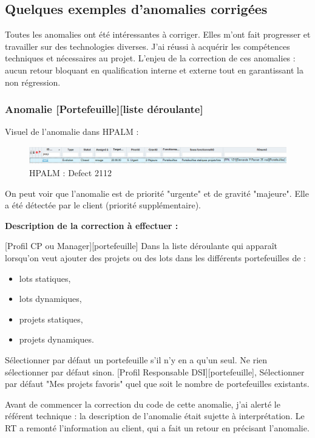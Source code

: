 \subsection{Quelques exemples d'anomalies corrigées}

Toutes les anomalies ont été intéressantes à corriger. Elles m'ont fait progresser et travailler sur des technologies diverses. J'ai réussi à acquérir les compétences techniques et nécessaires au projet. L'enjeu de la correction de ces anomalies : aucun retour bloquant en qualification interne et externe tout en garantissant la non régression.

\subsubsection{Anomalie [Portefeuille][liste déroulante]}

Visuel de l'anomalie dans HPALM :
\begin{figure}[!h]
\centering
\includegraphics[width=1\textwidth]{images/QC2120.PNG}
\caption{HPALM : Defect 2112}
\end{figure}

On peut voir que l'anomalie est de priorité "urgente" et de gravité "majeure". Elle a été détectée par le client (priorité supplémentaire).

\textbf{Description de la correction à effectuer :} 

[Profil CP ou Manager][portefeuille]
Dans la liste déroulante qui apparaît lorsqu'on veut ajouter des projets ou des lots dans les différents portefeuilles de : 
\begin{itemize}
    \item lots statiques,
    \item lots dynamiques,
    \item projets statiques,
    \item projets dynamiques.
\end{itemize}

Sélectionner par défaut un portefeuille s'il n'y en a qu'un seul. Ne rien sélectionner par défaut sinon. 
[Profil Responsable DSI][portefeuille], Sélectionner par défaut "Mes projets favoris" quel que soit le nombre de portefeuilles existants.

Avant de commencer la correction du code de cette anomalie, j'ai alerté le référent technique : la description de l'anomalie était sujette à interprétation. Le RT a remonté l'information au client, qui a fait un retour en précisant l'anomalie.

